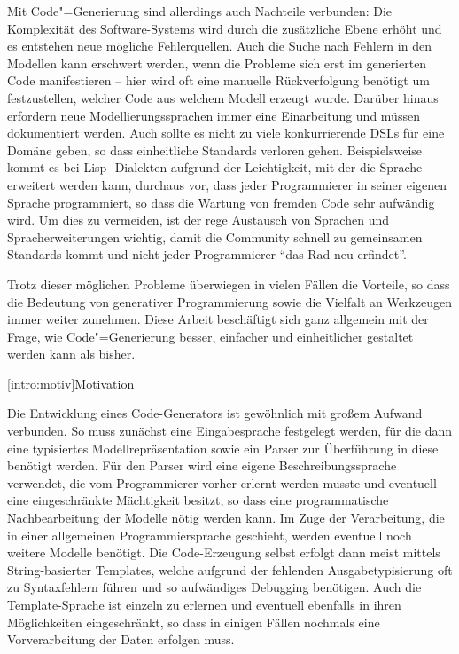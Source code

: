 \documentclass[12pt, a4paper, bibgerm]{scrbook}
\newcommand\lsection{}
\newcommand{\cgen}{Code"=Generierung}
\begin{document}
Mit \cgen{} sind allerdings auch Nachteile verbunden: Die Komplexität des
Software-Systems wird durch die zusätzliche Ebene erhöht und es
entstehen neue mögliche Fehlerquellen. Auch die Suche nach Fehlern in
den Modellen kann erschwert werden, wenn die Probleme sich erst im
generierten Code manifestieren -- hier wird oft eine manuelle
Rückverfolgung benötigt um festzustellen, welcher Code aus welchem
Modell erzeugt wurde. Darüber hinaus erfordern neue
Modellierungssprachen immer eine Einarbeitung und müssen dokumentiert
werden. Auch sollte es nicht zu viele konkurrierende DSLs für eine
Domäne geben, so dass einheitliche Standards verloren
gehen. Beispielsweise kommt es bei Lisp \cite{Lisp}-Dialekten aufgrund
der Leichtigkeit, mit der die Sprache erweitert werden kann, durchaus
vor, dass jeder Programmierer in seiner eigenen Sprache programmiert, so
dass die Wartung von fremden Code sehr aufwändig wird. Um dies zu
vermeiden, ist der rege Austausch von Sprachen und Spracherweiterungen
wichtig, damit die Community schnell zu gemeinsamen Standards kommt
und nicht jeder Programmierer "`das Rad neu erfindet"'.

Trotz dieser möglichen Probleme überwiegen in vielen Fällen die
Vorteile, so dass die Bedeutung von generativer Programmierung sowie die
Vielfalt an Werkzeugen immer weiter zunehmen. Diese Arbeit beschäftigt
sich ganz allgemein mit der Frage, wie \cgen{} besser, einfacher und
einheitlicher gestaltet werden kann als bisher.

\lsection[intro:motiv]{Motivation}

Die Entwicklung eines Code-Generators ist gewöhnlich mit großem Aufwand
verbunden. So muss zunächst eine Eingabesprache festgelegt werden, für
die dann eine typisiertes Modellrepräsentation sowie ein Parser zur
Überführung in diese benötigt werden. Für den Parser wird eine eigene
Beschreibungssprache verwendet, die vom Programmierer vorher erlernt
werden musste und eventuell eine eingeschränkte Mächtigkeit besitzt, so
dass eine programmatische Nachbearbeitung der Modelle nötig werden
kann. Im Zuge der Verarbeitung, die in einer allgemeinen
Programmiersprache geschieht, werden eventuell noch weitere Modelle
benötigt. Die Code-Erzeugung selbst erfolgt dann meist mittels
String-basierter Templates, welche aufgrund der fehlenden
Ausgabetypisierung oft zu Syntaxfehlern führen und so aufwändiges
Debugging benötigen. Auch die Template-Sprache ist einzeln zu erlernen
und eventuell ebenfalls in ihren Möglichkeiten eingeschränkt, so dass in
einigen Fällen nochmals eine Vorverarbeitung der Daten erfolgen muss.
\end{document}
